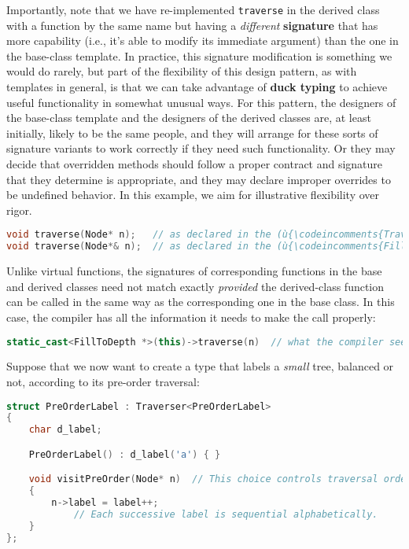Importantly, note that we have re-implemented \texttt{traverse} in the
derived class with a function by the same name but having a
\emph{different} \textbf{signature} that has more capability (i.e., it's able
to modify its immediate argument) than the one in the base-class
template. In practice, this signature modification is something we would
do rarely, but part of the flexibility of this design pattern, as with
templates in general, is that we can take advantage of \textbf{duck
typing} to achieve useful functionality in somewhat unusual ways. For
this pattern, the designers of the base-class template and the designers
of the derived classes are, at least initially, likely to be the same
people, and they will arrange for these sorts of signature variants to
work correctly if they need such functionality. Or they may decide that
overridden methods should follow a proper contract and signature that
they determine is appropriate, and they may declare improper overrides
to be undefined behavior. In this example, we aim for illustrative
flexibility over rigor.

\begin{lstlisting}[language=C++]
void traverse(Node* n);   // as declared in the (ù{\codeincomments{Traverser}}ù) base-class template
void traverse(Node*& n);  // as declared in the (ù{\codeincomments{FillToDepth}}ù) derived class
\end{lstlisting}

\noindent Unlike virtual functions, the signatures of corresponding functions in
the base and derived classes need not match exactly \emph{provided} the
derived-class function can be called in the same way as the
corresponding one in the base class. In this case, the compiler has all
the information it needs to make the call properly:

\begin{lstlisting}[language=C++]
static_cast<FillToDepth *>(this)->traverse(n)  // what the compiler sees
\end{lstlisting}

\noindent Suppose that we now want to create a type that labels a \emph{small}
tree, balanced or not, according to its pre-order traversal:

\begin{lstlisting}[language=C++]
struct PreOrderLabel : Traverser<PreOrderLabel>
{
    char d_label;

    PreOrderLabel() : d_label('a') { }

    void visitPreOrder(Node* n)  // This choice controls traversal order.
    {
        n->label = label++;
            // Each successive label is sequential alphabetically.
    }
};
\end{lstlisting}


